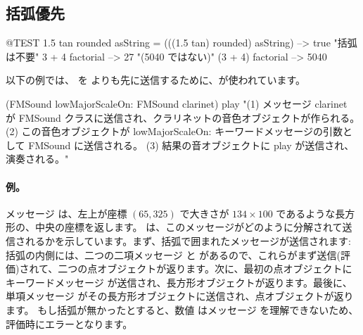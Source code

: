 \documentclass[a4paper,10pt,twoside]{book}
\begin{document}
\subsection{括弧優先}


\begin{code}{@TEST}
1.5 tan rounded asString = (((1.5 tan) rounded) asString) --> true    "括弧は不要"
3 + 4 factorial   --> 27    "(5040 ではない)"
(3 + 4) factorial --> 5040
\end{code}

以下の例では、 を  よりも先に送信するために、が使われています。
\begin{code}{}
(FMSound lowMajorScaleOn: FMSound clarinet) play 
"(1) メッセージ clarinet が FMSound クラスに送信され、クラリネットの音色オブジェクトが作られる。
 (2) この音色オブジェクトが lowMajorScaleOn: キーワードメッセージの引数として FMSound に送信される。
 (3) 結果の音オブジェクトに play が送信され、演奏される。"
\end{code}



\paragraph{例。}
メッセージ  は、左上が座標 $(65, 325)$ で大きさが $134{\times}100$ であるような長方形の、中央の座標を返します。 は、このメッセージがどのように分解されて送信されるかを示しています。まず、括弧で囲まれたメッセージが送信されます: 括弧の内側には、二つの二項メッセージ  と  があるので、これらがまず送信(評価)されて、二つの点オブジェクトが返ります。次に、最初の点オブジェクトにキーワードメッセージ  が送信され、長方形オブジェクトが返ります。最後に、単項メッセージ  がその長方形オブジェクトに送信され、点オブジェクトが返ります。
もし括弧が無かったとすると、数値  はメッセージ  を理解できないため、評価時にエラーとなります。
\end{document}
